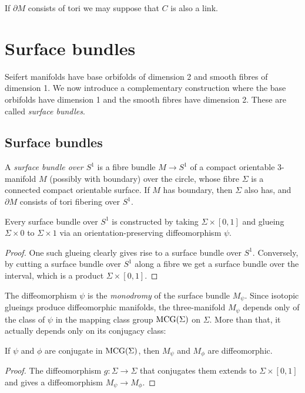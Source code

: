 If $\partial M$ consists of tori we may suppose that $C$ is also a link. 

\section{Surface bundles}
Seifert manifolds have base orbifolds of dimension 2 and smooth fibres of dimension 1. We now introduce a complementary construction where the base orbifolds have dimension 1 and the smooth fibres have dimension 2. These are called \emph{surface bundles}.

\subsection{Surface bundles}
A \emph{surface bundle over $S^1$} is a fibre bundle $M\to S^1$ of a compact orientable 3-manifold $M$ (possibly with boundary) over the circle, whose fibre $\Sigma$ is a connected compact orientable surface. If $M$ has boundary, then $\Sigma$ also has, and $\partial M$ consists of tori fibering over $S^1$.

\begin{prop}
Every surface bundle over $S^1$ is constructed by taking $\Sigma\times [0,1]$ and glueing $\Sigma\times 0$ to $\Sigma\times 1$ via an orientation-preserving diffeomorphism $\psi$.
\end{prop}
\begin{proof}
One such glueing clearly gives rise to a surface bundle over $S^1$. Conversely, by cutting a surface bundle over $S^1$ along a fibre we get a surface bundle over the interval, which is a product $\Sigma\times [0,1]$.
\end{proof}

The diffeomorphism $\psi$ is the \emph{monodromy} of the surface bundle $M_\psi$. Since isotopic glueings produce diffeomorphic manifolds, the three-manifold $M_\psi$ depends only of the class of $\psi$ in the mapping class group ${\rm MCG}(\Sigma)$ on $\Sigma$. More than that, it actually depends only on its conjugacy class:

\begin{prop}
If $\psi$ and $\phi$ are conjugate in ${\rm MCG}(\Sigma)$, then $M_\psi$ and $M_\phi$ are diffeomorphic.
\end{prop}
\begin{proof}
The diffeomorphism $g\colon \Sigma\to \Sigma$ that conjugates them extends to $\Sigma\times [0,1]$ and gives a diffeomorphism $M_\psi \to M_\phi$.
\end{proof}

